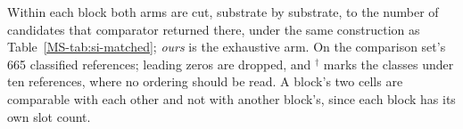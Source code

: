 \begin{table}[h]
\begin{threeparttable}
\begin{tabular}{@{}lrrrrrrrrr@{}}
\bottomrule
\end{tabular}
\begin{tablenotes}[flushleft]\footnotesize
\item Within each block both arms are cut, substrate by substrate, to the number of candidates that comparator returned there, under the same construction as Table~\ref{MS-tab:si-matched}; \emph{ours} is the exhaustive arm. On the comparison set's 665 classified references; leading zeros are dropped, and $^{\dagger}$ marks the classes under ten references, where no ordering should be read. A block's two cells are comparable with each other and not with another block's, since each block has its own slot count.
\end{tablenotes}
\end{threeparttable}
\end{table}
